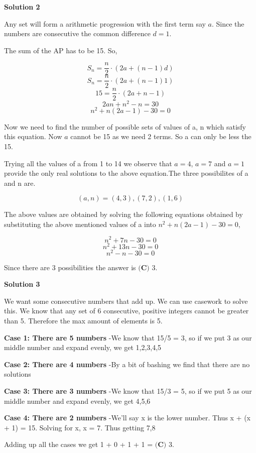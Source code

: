 \begin{enumerate}
 



\textbf{Solution 2}

Any set will form a arithmetic progression with the first term say $a$. Since the numbers are consecutive the common difference $d = 1$.

 The sum of the AP has to be 15. So,

 
 \[S_n = \frac{n}{2} \cdot (2a + (n-1)d)\]
 \[S_n = \frac{n}{2} \cdot (2a + (n-1)1)\]
 \[15 = \frac{n}{2} \cdot (2a + n - 1)\]
 \[2an + n^2 - n = 30\]
 \[n^2 + n(2a - 1) - 30 = 0\]

 Now we need to find the number of possible sets of values of a, n which satisfy this equation. Now $a$ cannot be 15 as we need 2 terms. So a can only be less the 15.

 Trying all the values of a from 1 to 14 we observe that $a = 4$, $a = 7$ and $a = 1$ provide the only real solutions to the above equation.The three possibilites of a and n are.

 
 \[(a,n) = (4,3),(7, 2),(1, 6)\]

 The above values are obtained by solving the following equations obtained by substituting the above mentioned values of a into $n^2 + n(2a - 1) - 30 = 0$,

 
 \[n^2 + 7n - 30 = 0\]
 \[n^2 + 13n - 30 = 0\]
 \[n^2 - n - 30 = 0\]

 Since there are 3 possibilities the answer is $\boxed{\textbf{(C) }3}.$




\textbf{Solution 3}

We want some consecutive numbers that add up. We can use casework to solve this. We know that any set of 6 consecutive, positive integers cannot be greater than 5. Therefore the max amount of elements is 5.

 \textbf{Case 1: There are 5 numbers} -We know that 15/5 = 3, so if we put 3 as our middle number and expand evenly, we get {1,2,3,4,5}

 \textbf{Case 2: There are 4 numbers} -By a bit of bashing we find that there are no solutions

 \textbf{Case 3: There are 3 numbers} -We know that 15/3 = 5, so if we put 5 as our middle number and expand evenly, we get {4,5,6}

 \textbf{Case 4: There are 2 numbers} -We'll say x is the lower number. Thus x + (x + 1) = 15. Solving for x, x = 7. Thus getting {7,8}

 Adding up all the cases we get 1 + 0 + 1 + 1 = $\boxed{\textbf{(C) }3}.$




\end{enumerate}
